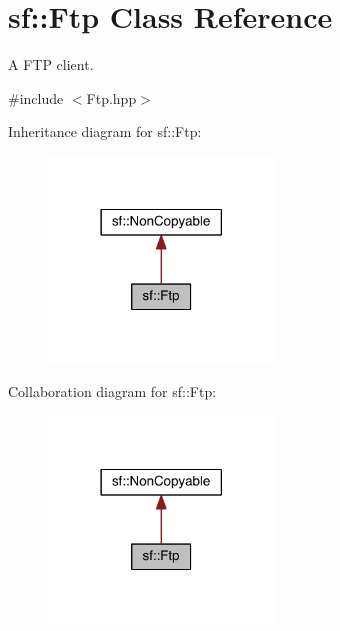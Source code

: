 \hypertarget{classsf_1_1_ftp}{\section{sf\-:\-:Ftp Class Reference}
\label{classsf_1_1_ftp}
}


A F\-T\-P client.  




{\ttfamily \#include $<$Ftp.\-hpp$>$}



Inheritance diagram for sf\-:\-:Ftp\-:
\nopagebreak
\begin{figure}[H]
\begin{center}
\leavevmode
\includegraphics[width=170pt]{classsf_1_1_ftp__inherit__graph}
\end{center}
\end{figure}


Collaboration diagram for sf\-:\-:Ftp\-:
\nopagebreak
\begin{figure}[H]
\begin{center}
\leavevmode
\includegraphics[width=170pt]{classsf_1_1_ftp__coll__graph}
\end{center}
\end{figure}
